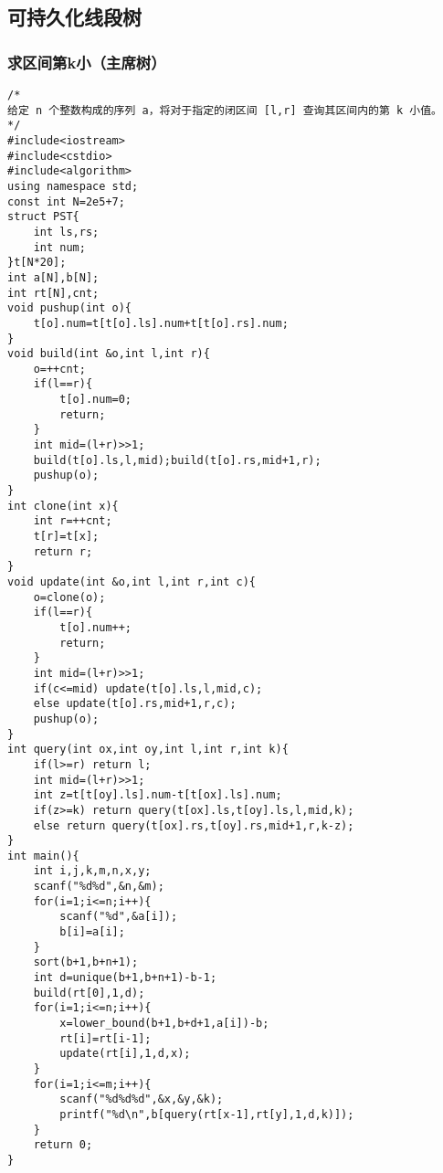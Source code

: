 \subsection{可持久化线段树}
\subsubsection{求区间第k小（主席树）}
\begin{lstlisting}
/*
给定 n 个整数构成的序列 a，将对于指定的闭区间 [l,r] 查询其区间内的第 k 小值。
*/
#include<iostream>
#include<cstdio>
#include<algorithm>
using namespace std; 
const int N=2e5+7;
struct PST{
	int ls,rs;
	int num;
}t[N*20];
int a[N],b[N];
int rt[N],cnt;
void pushup(int o){
	t[o].num=t[t[o].ls].num+t[t[o].rs].num;
}
void build(int &o,int l,int r){
	o=++cnt;
	if(l==r){
		t[o].num=0;
		return;
	}
	int mid=(l+r)>>1;
	build(t[o].ls,l,mid);build(t[o].rs,mid+1,r);
	pushup(o);
}
int clone(int x){
	int r=++cnt;
	t[r]=t[x];
	return r;
}
void update(int &o,int l,int r,int c){
	o=clone(o);
	if(l==r){
		t[o].num++;
		return;
	}
	int mid=(l+r)>>1;
	if(c<=mid) update(t[o].ls,l,mid,c);
	else update(t[o].rs,mid+1,r,c);
	pushup(o);
}
int query(int ox,int oy,int l,int r,int k){
	if(l>=r) return l;
	int mid=(l+r)>>1;
	int z=t[t[oy].ls].num-t[t[ox].ls].num;
	if(z>=k) return query(t[ox].ls,t[oy].ls,l,mid,k);
	else return query(t[ox].rs,t[oy].rs,mid+1,r,k-z);
}
int main(){
	int i,j,k,m,n,x,y;
	scanf("%d%d",&n,&m);
	for(i=1;i<=n;i++){
		scanf("%d",&a[i]);
		b[i]=a[i];
	}
	sort(b+1,b+n+1);
	int d=unique(b+1,b+n+1)-b-1;
	build(rt[0],1,d);
	for(i=1;i<=n;i++){
		x=lower_bound(b+1,b+d+1,a[i])-b;
		rt[i]=rt[i-1];
		update(rt[i],1,d,x);
	}
	for(i=1;i<=m;i++){
		scanf("%d%d%d",&x,&y,&k);
		printf("%d\n",b[query(rt[x-1],rt[y],1,d,k)]);
	}
	return 0;
}
\end{lstlisting}


